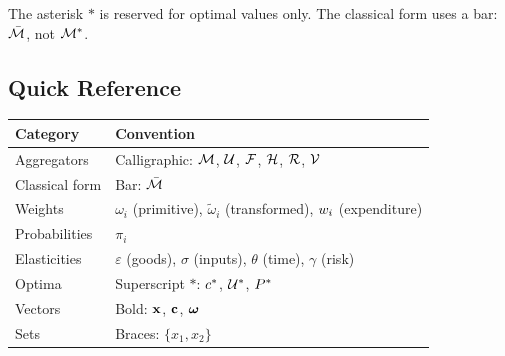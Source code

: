 \begin{calloutcaution}
The asterisk $*$ is reserved for optimal values only. The classical form uses a bar: $\bar{\mathcal{M}}$, not $\mathcal{M}^*$.
\end{calloutcaution}

\subsection*{Quick Reference}

\begin{calloutnote}[At a Glance]
\small
\begin{tabular}{@{}p{}p{}@{}}
\toprule
\textbf{Category} & \textbf{Convention} \\
\midrule
Aggregators & Calligraphic: $\mathcal{M}$, $\mathcal{U}$, $\mathcal{F}$, $\mathcal{H}$, $\mathcal{R}$, $\mathcal{V}$ \\
Classical form & Bar: $\bar{\mathcal{M}}$ \\
Weights & $\omega_i$ (primitive), $\tilde{\omega}_i$ (transformed), $w_i$ (expenditure) \\
Probabilities & $\pi_i$ \\
Elasticities & $\varepsilon$ (goods), $\sigma$ (inputs), $\theta$ (time), $\gamma$ (risk) \\
Optima & Superscript $*$: $c^{*}$, $\mathcal{U}^{*}$, $P^{*}$ \\
Vectors & Bold: $\mathbf{x}$, $\mathbf{c}$, $\boldsymbol{\omega}$ \\
Sets & Braces: $\{x_1, x_2\}$ \\
\bottomrule
\end{tabular}
\end{calloutnote}
